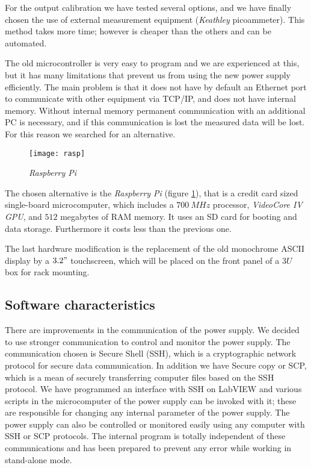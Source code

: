 For the output calibration we have tested several options, and we have finally chosen the use of external measurement equipment (\emph{Keathley} picoammeter). This method takes more time; however is cheaper than the others and can be automated.

The old microcontroller is very easy to program and we are experienced at this, but it has many limitations that prevent us from using the new power supply efficiently. The main problem is that it does not have by default an Ethernet port to communicate with other equipment via TCP/IP, and does not have internal memory. Without internal memory permanent communication with an additional PC is necessary, and if this communication is lost the measured data will be lost. For this reason we searched for an alternative.

\begin{figure}[ht]
\centering 
\texttt{[image: rasp]} 
\caption{\textit{Raspberry Pi}} 
\label{fig:rasp} 
\end{figure}

The chosen alternative is the \emph{Raspberry Pi} (figure \ref{fig:rasp}), that is a credit card sized single-board microcomputer, which includes a $700\ MHz$ processor, \emph{VideoCore IV GPU}, and $512$ megabytes of RAM memory.  It uses an SD card for booting and data storage. Furthermore it costs less than the previous one.

The last hardware modification is the replacement of the old monochrome ASCII display by a $3.2"$ touchscreen, which will be placed on the front panel of a $3U$ box for rack mounting.

\subsection{Software characteristics}

There are improvements in the communication of the power supply. We decided to use stronger communication to control and monitor the power supply. The communication chosen is Secure Shell (SSH), which is a cryptographic network protocol for secure data communication. In addition we have Secure copy or SCP, which is a mean of securely transferring computer files based on the SSH protocol.
We have programmed an interface with SSH on LabVIEW and various scripts in the microcomputer of the power supply can be invoked with it; these are responsible for changing any internal parameter of the power supply.
The power supply can also be controlled or monitored easily using any computer with SSH or SCP protocols. The internal program is totally independent of these communications and has been prepared to prevent any error while working in stand-alone mode.


